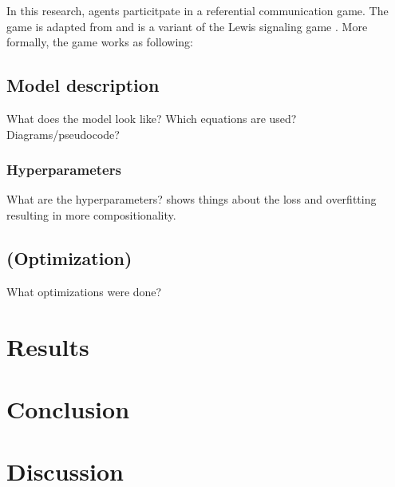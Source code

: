 \documentclass[a4paper, 12pt]{report}
\begin{document}
In this research, agents particitpate in a referential communication game.
The game is adapted from  and is a variant of the Lewis signaling game \cite{lewis}.
More formally, the game works as following:

\section{Model description}
What does the model look like? Which equations are used? Diagrams/pseudocode?

\subsection{Hyperparameters}
What are the hyperparameters?
\cite{RitaMathieu2022ECGa} shows things about the loss and overfitting resulting in more compositionality.

\section{(Optimization)}
What optimizations were done?

\chapter{Results}


\chapter{Conclusion}


\chapter{Discussion}



\end{document}
